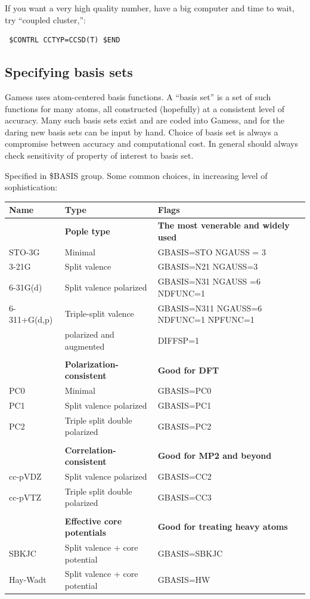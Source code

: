 \documentclass[11pt]{article}
\begin{document}
If you want a very high quality number, have a big computer and time to wait, try ``coupled cluster,'':
\begin{verbatim}
 $CONTRL CCTYP=CCSD(T) $END
\end{verbatim}

\subsection{Specifying basis sets}
\label{sec:orgc69c4ec}
Gamess uses atom-centered basis functions.  A ``basis set'' is a set of such functions for many atoms, all constructed (hopefully) at a consistent level of accuracy. Many such basis sets exist and are coded into Gamess, and for the daring new basis sets can be input by hand.  Choice of basis set is always a compromise between accuracy and computational cost.  In general should always check sensitivity of property of interest to basis set.

Specified in \$BASIS group.  Some common choices, in increasing level of sophistication:

\begin{center}
\begin{tabular}{lll}
\hline
Name & Type & Flags\\
\hline
 & \textbf{Pople type} & \textbf{The most venerable and widely used}\\
STO-3G & Minimal & GBASIS=STO  NGAUSS = 3\\
3-21G & Split valence & GBASIS=N21  NGAUSS=3\\
6-31G(d) & Split valence polarized & GBASIS=N31 NGAUSS =6 NDFUNC=1\\
6-311+G(d,p) & Triple-split valence & GBASIS=N311 NGAUSS=6 NDFUNC=1 NPFUNC=1\\
 & polarized and augmented & DIFFSP=1\\
 &  & \\
 & \textbf{Polarization-consistent} & \textbf{Good for DFT}\\
PC0 & Minimal & GBASIS=PC0\\
PC1 & Split valence polarized & GBASIS=PC1\\
PC2 & Triple split double polarized & GBASIS=PC2\\
 &  & \\
 & \textbf{Correlation-consistent} & \textbf{Good for MP2 and beyond}\\
cc-pVDZ & Split valence polarized & GBASIS=CC2\\
cc-pVTZ & Triple split double polarized & GBASIS=CC3\\
 &  & \\
 & \textbf{Effective core potentials} & \textbf{Good for treating heavy atoms}\\
SBKJC & Split valence + core potential & GBASIS=SBKJC\\
Hay-Wadt & Split valence + core potential & GBASIS=HW\\
\hline
\end{tabular}
\end{center}
\end{document}
